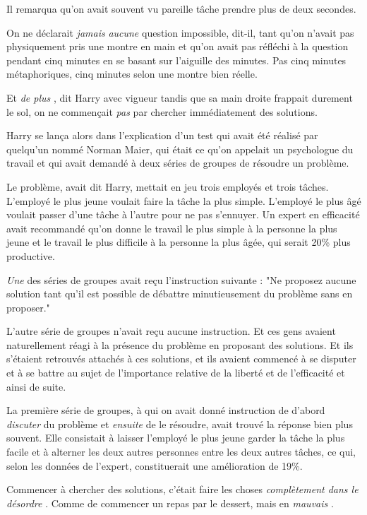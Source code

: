 Il remarqua qu'on avait souvent vu pareille tâche prendre plus de deux secondes.

On ne déclarait \emph{jamais}  \emph{aucune} question impossible, dit-il, tant qu'on n'avait pas physiquement pris une montre en main et qu'on avait pas réfléchi à la question pendant cinq minutes en se basant sur l'aiguille des minutes. Pas cinq minutes métaphoriques, cinq minutes selon une montre bien réelle.

Et \emph{de plus} , dit Harry avec vigueur tandis que sa main droite frappait durement le sol, on ne commençait \emph{pas} par chercher immédiatement des solutions.

Harry se lança alors dans l'explication d'un test qui avait été réalisé par quelqu'un nommé Norman Maier, qui était ce qu'on appelait un psychologue du travail et qui avait demandé à deux séries de groupes de résoudre un problème.

Le problème, avait dit Harry, mettait en jeu trois employés et trois tâches. L'employé le plus jeune voulait faire la tâche la plus simple. L'employé le plus âgé voulait passer d'une tâche à l'autre pour ne pas s'ennuyer. Un expert en efficacité avait recommandé qu'on donne le travail le plus simple à la personne la plus jeune et le travail le plus difficile à la personne la plus âgée, qui serait 20\% plus productive.

\emph{Une} des séries de groupes avait reçu l'instruction suivante : "Ne proposez aucune solution tant qu'il est possible de débattre minutieusement du problème sans en proposer."

L'autre série de groupes n'avait reçu aucune instruction. Et ces gens avaient naturellement réagi à la présence du problème en proposant des solutions. Et ils s'étaient retrouvés attachés à ces solutions, et ils avaient commencé à se disputer et à se battre au sujet de l'importance relative de la liberté et de l'efficacité et ainsi de suite.

La première série de groupes, à qui on avait donné instruction de d'abord \emph{discuter}  du problème et \emph{ensuite} de le résoudre, avait trouvé la réponse bien plus souvent. Elle consistait à laisser l'employé le plus jeune garder la tâche la plus facile et à alterner les deux autres personnes entre les deux autres tâches, ce qui, selon les données de l'expert, constituerait une amélioration de 19\%.

Commencer à chercher des solutions, c'était faire les choses \emph{complètement dans le désordre} . Comme de commencer un repas par le dessert, mais en \emph{mauvais} .

